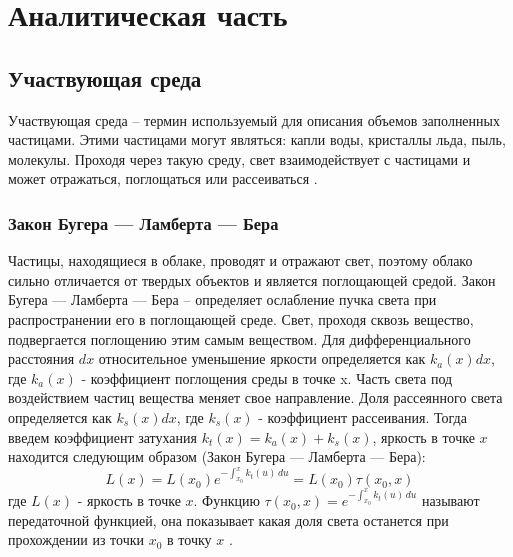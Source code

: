 \chapter{Аналитическая часть}

\section{Участвующая среда}

Участвующая среда -- термин используемый для описания объемов заполненных частицами. Этими частицами могут являться: капли воды, кристаллы льда, пыль, молекулы. Проходя через такую среду, свет взаимодействует с частицами и может отражаться, поглощаться или рассеиваться \cite{frostbite}.  

\subsection{Закон Бугера — Ламберта — Бера}
Частицы, находящиеся в облаке, проводят и отражают свет, поэтому облако
сильно отличается от твердых объектов и является поглощающей средой.
Закон Бугера — Ламберта — Бера – определяет ослабление пучка света при распространении его в поглощающей среде. 
Свет, проходя сквозь вещество, подвергается поглощению этим самым веществом. Для дифференциального расстояния $ dx $ относительное уменьшение яркости определяется как $ k_a(x)dx $, где $ k_a(x) $ - коэффициент поглощения среды в точке x. Часть света под воздействием частиц вещества меняет свое направление. Доля рассеянного света определяется как $ k_s(x)dx $, где $ k_s(x) $ - коэффициент рассеивания. Тогда введем коэффициент затухания $ k_t(x)  = k_a(x) + k_s(x) $, яркость в точке $x$ находится следующим образом (Закон Бугера — Ламберта — Бера):  
\begin{equation}
	\label{beers_law}
	L(x) = L(x_0) e^{-\int_{x_0}^{x} k_t(u)\,du}=L(x_0)\tau(x_0, x) 
\end{equation}
где $ L(x) $ - яркость в точке $ x $. Функцию $ \tau(x_0, x) = e^{-\int_{x_0}^{x} k_t(u)\,du}  $ называют передаточной функцией, она показывает какая доля света останется при прохождении из точки $ x_0 $ в точку $ x $ \cite{partmedia}.

